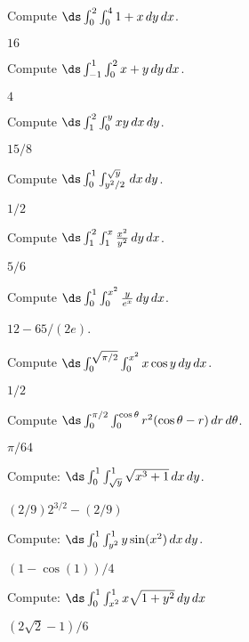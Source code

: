 \begin{exercises}

\exercise Compute $\ds \int_{0}^{2}\int_{0}^{4} 1+x \,dy\,dx$.
\begin{answer} $16$
\end{answer}

\exercise Compute $\ds \int_{-1}^{1}\int_{0}^{2} x+y\,dy\,dx$.
\begin{answer} $4$
\end{answer}


\exercise Compute $\ds \int_{1}^{2}\int_{0}^{y} xy \,dx\,dy$.
\begin{answer} $15/8$
\end{answer}


\exercise Compute $\ds \int_{0}^{1}\int_{y^2/2}^{\sqrt y} \,dx\,dy$.
\begin{answer} $1/2$
\end{answer}


\exercise Compute $\ds \int_{1}^{2}\int_{1}^{x} {x^2\over y^2}\,dy\,dx$.
\begin{answer} $5/6$
\end{answer}


\exercise Compute $\ds \int_{0}^{1}\int_{0}^{x^2} {y\over e^x}\,dy\,dx$.
\begin{answer} $12-65/(2e)$.
\end{answer}


\exercise Compute $\ds \int_{0}^{\sqrt{\pi/2}}\int_{0}^{x^2} x\cos y\,dy\,dx$.
\begin{answer} $1/2$
\end{answer}


\exercise Compute $\ds \int_{0}^{\pi/2}\int_{0}^{\cos\theta}r^2
(\cos\theta-r) \,dr\,d\theta$.
\begin{answer} $\pi/64$
\end{answer}

\exercise  Compute: $\ds \int_0^1\int_{\sqrt{y}}^1 
\sqrt{x^3+1}\,dx\,dy$.
\begin{answer} $(2/9)2^{3/2}-(2/9)$
\end{answer}

\exercise Compute: $\ds \int_0^1\int_{y^2}^1 
y\sin(x^2)\,dx\,dy$.
\begin{answer} $(1-\cos(1))/4$
\end{answer}

\exercise Compute: $\ds \int_0^1 \int_{x^2}^1 x\sqrt{1+y^2}\,dy\,dx$
\begin{answer} $(2\sqrt2-1)/6$
\end{answer}


\end{exercises}
